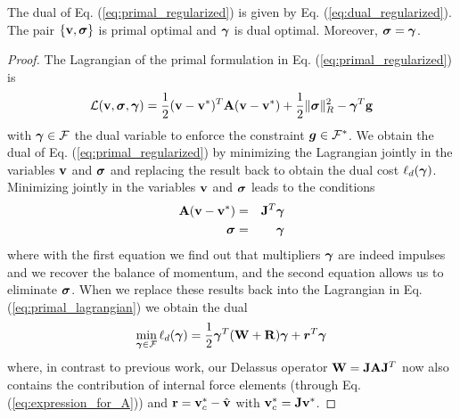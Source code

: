 \begin{theorem}
The dual of Eq. (\ref{eq:primal_regularized}) is given by Eq.
(\ref{eq:dual_regularized}). The pair $\{{\mathbf{v}},{\bm\sigma}\}$ is primal optimal and
${\bm\gamma}$ is dual optimal. Moreover, ${\bm\sigma} = {\bm\gamma}$.
\end{theorem}

\begin{proof}
The Lagrangian of the primal formulation in Eq. (\ref{eq:primal_regularized}) is
\begin{equation}
	\mathcal{L}(\mf{v},\bsigma,\vf{\gamma}) = \frac{1}{2}(\mf{v}-\mf{v}^*)^T\mf{A}(\mf{v}-\mf{v}^*) + \frac{1}{2} \Vert\bsigma\Vert_{R}^2 - \vf{\gamma}^T\mf{g}
	\label{eq:primal_lagrangian}
\end{equation}
with ${\bm{\gamma}}\in\mathcal{F}$ the dual variable to enforce the constraint
${\bm{g}}\in \mathcal{F}^*$. We obtain the dual of Eq.
(\ref{eq:primal_regularized}) by minimizing the Lagrangian jointly in the
variables ${\mathbf{v}}$ and ${\bm\sigma}$ and replacing the result back to obtain the
dual cost $\ell_d({\bm{\gamma}})$. Minimizing jointly in the variables ${\mathbf{v}}$
and ${\bm\sigma}$ leads to the conditions
\begin{eqnarray}
	{\mathbf{A}}({\mathbf{v}}-{\mathbf{v}}^*) &=& {\mathbf{J}}^T{\bm{\gamma}}\\
	{\bm{\sigma}} &=& {\bm{\gamma}}
\end{eqnarray}
where with the first equation we find out that multipliers ${\bm\gamma}$ are indeed
impulses and we recover the balance of momentum, and the second equation allows
us to eliminate ${\bm{\sigma}}$. When we replace these results back into the
Lagrangian in Eq. (\ref{eq:primal_lagrangian}) we obtain the dual
\begin{eqnarray}
	\min_{{\bm\gamma}\in \mathcal{F}} \ell_d({\bm\gamma}) =
	\frac{1}{2}{\bm\gamma}^T(\mathbf{W}+\mathbf{R}){\bm\gamma} + {\bm r}^T
	{\bm\gamma}
\end{eqnarray}
where, in contrast to previous work, our Delassus operator
${\mathbf{W}}={\mathbf{J}}{\mathbf{A}}{\mathbf{J}}^T$ now also contains the contribution of internal
force elements (through Eq. (\ref{eq:expression_for_A})) and
${\mathbf{r}}={\mathbf{v}}_c^*-\hat{{\mathbf{v}}}$ with ${\mathbf{v}}_c^*={\mathbf{J}}{\mathbf{v}}^*$.
\end{proof}
